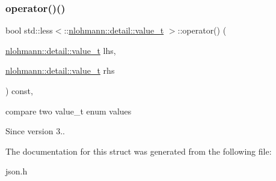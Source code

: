 \subsubsection{\texorpdfstring{operator()()}{operator()()}}
{\footnotesize\ttfamily bool std\+::less$<$\+::\hyperlink{namespacenlohmann_1_1detail_a90aa5ef615aa8305e9ea20d8a947980f}{nlohmann\+::detail\+::value\+\_\+t} $>$\+::operator() (\begin{DoxyParamCaption}\item[{\hyperlink{namespacenlohmann_1_1detail_a90aa5ef615aa8305e9ea20d8a947980f}{nlohmann\+::detail\+::value\+\_\+t}}]{lhs,  }\item[{\hyperlink{namespacenlohmann_1_1detail_a90aa5ef615aa8305e9ea20d8a947980f}{nlohmann\+::detail\+::value\+\_\+t}}]{rhs }\end{DoxyParamCaption}) const\hspace{0.3cm}{\ttfamily [inline]}, {\ttfamily [noexcept]}}



compare two value\+\_\+t enum values 

\begin{DoxySince}{Since}
version 3.. 
\end{DoxySince}


The documentation for this struct was generated from the following file\+:\begin{DoxyCompactItemize}
\item 
json.\+h\end{DoxyCompactItemize}
